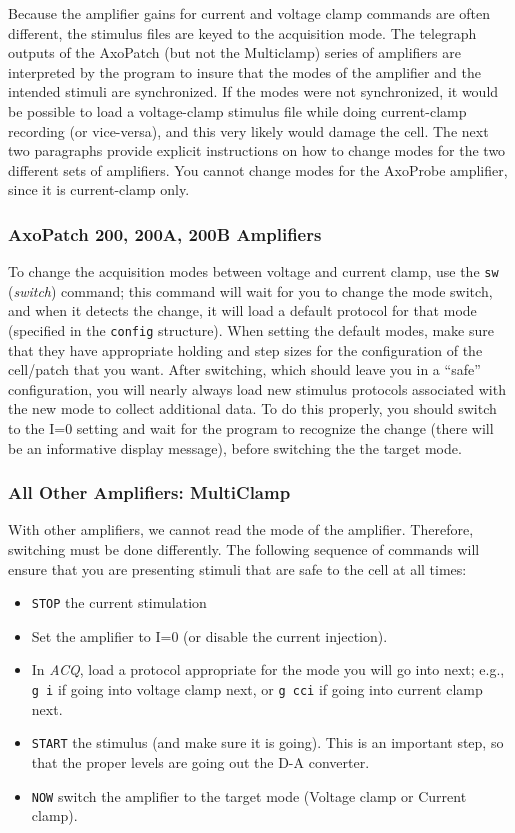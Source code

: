 \documentclass[11pt, letterpaper, titlepage]{paper}
\newcommand{\acq}{\textsl{ACQ}}
\begin{document}
Because the amplifier gains for current and voltage clamp commands 
are often different, the stimulus files are keyed to the 
acquisition mode. The telegraph outputs of the AxoPatch (but not 
the Multiclamp) series of amplifiers are interpreted by the 
program to insure that the modes of the amplifier and the intended 
stimuli are synchronized. If the modes were not synchronized, it 
would be possible to load a voltage-clamp stimulus file while 
doing current-clamp recording (or vice-versa), and this very 
likely would damage the cell. The next two paragraphs provide 
explicit instructions on how to change modes for the two different 
sets of amplifiers. You cannot change modes for the AxoProbe 
amplifier, since it is current-clamp only.

\subsubsection{AxoPatch 200, 200A, 200B Amplifiers}

To change the acquisition modes between voltage and current clamp, 
use the \texttt{sw} (\textsl{switch}) command; this command will 
wait for you to change the mode switch, and when it detects the 
change, it will load a default protocol for that mode (specified 
in the \texttt{config} structure). When setting the default modes, 
make sure that they have appropriate holding and step sizes for 
the configuration of the cell/patch that you want. After 
switching, which should leave you in a ``safe'' configuration, you 
will nearly always load new stimulus protocols associated with the 
new mode to collect additional data. To do this properly, you 
should switch to the I=0 setting and wait for the program to 
recognize the change (there will be an informative display 
message), before switching the the target mode.

\subsubsection{All Other Amplifiers: MultiClamp}

With other amplifiers, we cannot read the mode of the amplifier. 
Therefore, switching must be done differently. The following 
sequence of commands will ensure that you are presenting stimuli 
that are safe to the cell at all times:

\begin{itemize}
  \item \texttt{STOP} the current stimulation
  \item Set the amplifier to I=0 (or disable the current injection).
  \item In \acq, load a protocol appropriate for the mode you will go 
into next; e.g., \texttt{g i} if going into voltage clamp next, or 
\texttt{g cci} if going into current clamp next.
  \item \texttt{START} the stimulus (and make sure it is going). This 
is an important step, so that the proper levels are going out the 
D-A converter.
  \item \texttt{NOW} switch the amplifier to the target mode (Voltage 
clamp or Current clamp).
   \end{itemize}
\end{document}
